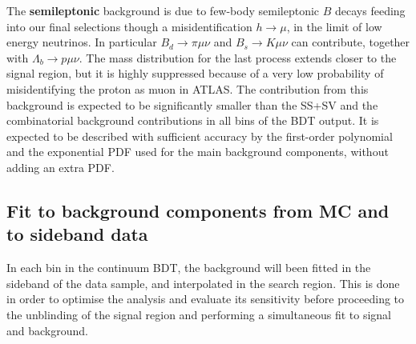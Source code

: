 The {\bf semileptonic} background is due to few-body semileptonic 
$B$ decays feeding into our final selections though a misidentification
$h \to \mu$, in the limit of low energy neutrinos.
In particular  $B_d \to \pi\mu\nu$ and $B_s \to K\mu\nu$ can contribute,
together with $\Lambda_b \to p\mu\nu$. The mass distribution for the last
process extends closer to the signal region, but it is highly suppressed
because of a very low probability of misidentifying the proton as muon in
ATLAS.
The contribution from this  background is expected to be significantly smaller than the SS+SV
and the combinatorial background contributions in all bins of the BDT output. 
It is expected to be described with 
sufficient accuracy by the first-order polynomial and the exponential PDF used for the main 
background components, without adding an extra PDF.\\

\subsection{Fit to background components from MC and to sideband data}
\label{sub:sec:bkg-normalisation-fit}
In each bin in the continuum BDT, the background will been fitted in the
sideband of the data sample,  and interpolated in the search region. 
This is done in order to optimise the analysis and evaluate its sensitivity 
before proceeding to the unblinding of the signal region and performing a
simultaneous fit to signal and background.\\




